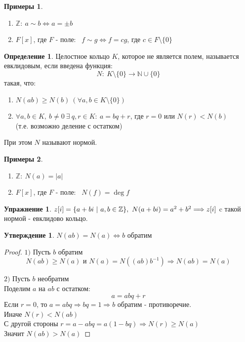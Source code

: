\documentclass[a4paper, 12pt]{article}
\newcommand{\Z}{\mathbb Z}
\newcommand{\N}{\mathbb N}
\newcommand\tab[1][.5cm]{\hspace*{#1}}
\theoremstyle{definition}
\newtheorem*{definition}{Определение}
\newtheorem*{subtheorem}{Утверждение}
\newtheorem*{example}{Примеры}
\newtheorem*{Exercise}{Упражнение}
\begin{document}
  \begin{example}\tab
    \begin{enumerate}
      \item $\Z: \ a \sim b \Longleftrightarrow a= \pm  b$
      \item $F[x]$, где $F$ - поле: \ 
      $f\sim g \Longleftrightarrow f = cg$, где $c \in F \setminus \{0\}$
    \end{enumerate}
  \end{example}
  \begin{definition}
    Целостное кольцо $K$, которое не является полем, называется евклидовым, если введена функция:
    $$N: \ K\setminus \{0\} \to \N \cup \{0\}$$
    такая, что:
    \begin{enumerate}
      \item $N(ab)\geq N(b) \ (\forall a, b \in K\setminus \{0\})$
      \item $\forall a, b \in K, \ b\neq 0 \ \exists \ q, r \in K :  \ a = bq+r$, где $r=0$ или $N(r)<N(b)$ \\
      (т.е. возможно деление с остатком)   
    \end{enumerate}
    При этом $N$ называют нормой.  
  \end{definition}
  \begin{example}\tab
    \begin{enumerate}
      \item $\Z: \  N(a) = |a|$
      \item $F[x]$, где $F$ - поле: \ $N(f) = \deg f$   
    \end{enumerate}
  \end{example}
  \begin{Exercise}
    $z[i] = \{a+bi \ | \ a, b \in \Z\}, \ N(a + bi) = a^2 + b^2 \Longrightarrow \\
    z[i]$ c такой нормой - евклидово кольцо. 
  \end{Exercise}
  \begin{subtheorem}
    $N(ab) = N(a) \Longleftrightarrow b$ обратим 
  \end{subtheorem}
  \begin{proof}\tab
    \item[$1)$] Пусть $b$ обратим
    $$N(ab) \geq N(a) \text{ и } N(a) = N((ab)b^{-1}) \Longrightarrow N(ab) = N(a)$$
    \item[$2)$] Пусть $b$ необратим\\
    Поделим $a$ на $ab$ с остатком: 
    $$a = abq + r$$
    Если $r =0$, то $a = abq \Longrightarrow bq = 1 \Longrightarrow b$ обратим - противоречие.\\
    Иначе $N(r)<N(ab)$\\
    С другой стороны $r = a - abq = a(1-bq) \Longrightarrow N(r) \geq N(a)$\\
    Значит $N(ab) > N(a)$ 
  \end{proof}
\end{document}

